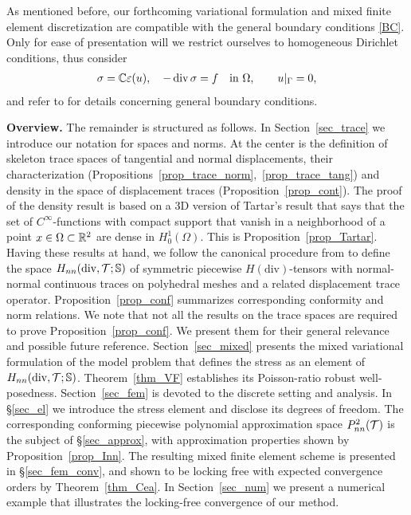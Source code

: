 \documentclass[11pt]{article}
\begin{document}
As mentioned before, our forthcoming variational formulation and mixed finite element
discretization are compatible with the general boundary conditions \eqref{BC}.
Only for ease of presentation will we restrict ourselves to homogeneous Dirichlet
conditions, thus consider
\begin{align} \label{model}
   \sigma=\mathbb{C}\varepsilon(u),\quad
   -\operatorname{div}\sigma=f\quad\text{in}\ \Omega,\qquad
   u|_\Gamma=0,
\end{align}
and refer to \cite{CarstensenH_NNC} for details concerning general boundary conditions.

{\bf Overview.} The remainder is structured as follows. In Section~\ref{sec_trace}
we introduce our notation for spaces and norms. At the center is the definition
of skeleton trace spaces of tangential and normal displacements,
their characterization (Propositions~\ref{prop_trace_norm},~\ref{prop_trace_tang})
and density in the space of displacement traces (Proposition~\ref{prop_cont}).
The proof of the density result is based on a 3D version of
Tartar's result that says that the set of $C^\infty$-functions with compact support
that vanish in a neighborhood of a point $x\in\Omega\subset\mathbb{R}^2$ are dense in $H^1_0(\Omega)$.
This is Proposition~\ref{prop_Tartar}. Having these results at hand,
we follow the canonical procedure from \cite{CarstensenH_NNC} to define
the space $H_{nn}(\operatorname{div},\mathcal{T};\mathbb{S})$ of symmetric piecewise $H(\mathrm{div})$-tensors
with normal-normal continuous traces on polyhedral meshes and a related displacement
trace operator.
Proposition~\ref{prop_conf} summarizes corresponding conformity and norm relations.
We note that not all the results on the trace spaces are required to prove
Proposition~\ref{prop_conf}.
We present them for their general relevance and possible future reference.
Section~\ref{sec_mixed} presents the mixed variational formulation of the model
problem that defines the stress as an element of $H_{nn}(\operatorname{div},\mathcal{T};\mathbb{S})$.
Theorem~\ref{thm_VF} establishes its Poisson-ratio robust well-posedness.
Section~\ref{sec_fem} is devoted to the discrete setting and analysis.
In \S\ref{sec_el} we introduce the stress element and disclose its degrees of freedom.
The corresponding conforming piecewise polynomial approximation space
$P^2_{nn}(\mathcal{T})$ is the subject of \S\ref{sec_approx}, with approximation
properties shown by Proposition~\ref{prop_Inn}.
The resulting mixed finite element scheme is presented in \S\ref{sec_fem_conv},
and shown to be locking free with expected convergence orders by
Theorem~\ref{thm_Cea}. In Section~\ref{sec_num} we present a numerical example
that illustrates the locking-free convergence of our method.
\end{document}
